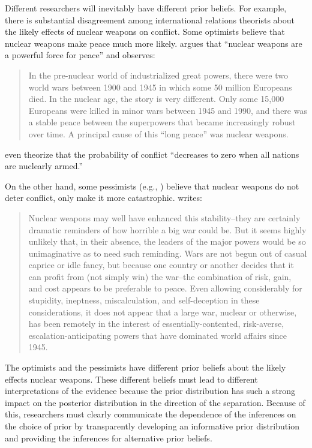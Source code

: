 \documentclass[12pt]{article}
\begin{document}
Different researchers will inevitably have different prior beliefs. 
For example, there is substantial disagreement among international relations theorists about the likely effects of nuclear weapons on conflict. 
Some optimists believe that nuclear weapons make peace much more likely. 
\citet[p. 57]{Mearsheimer1993} argues that ``nuclear weapons are a powerful force for peace'' and observes:
\begin{quote}
In the pre-nuclear world of industrialized great powers, there were two world wars between 1900 and 1945 in which some 50 million Europeans died. In the nuclear age, the story is very different. Only some 15,000 Europeans were killed in minor wars between 1945 and 1990, and there was a stable peace between the superpowers that became increasingly robust over time. A principal cause of this ``long peace'' was nuclear weapons.
\end{quote}
\citet[p. 283]{BDMRiker1982} even theorize that the probability of conflict ``decreases to zero when all nations are nuclearly armed.'' 

On the other hand, some pessimists (e.g., \citealt{Sagan1994}) believe that nuclear weapons do not deter conflict, only make it more catastrophic. 
\citet[pp. 68-69]{Mueller1988} writes: 
\begin{quote}
Nuclear weapons may well have enhanced this stability--they are certainly dramatic reminders of how horrible a big war could be. But it seems highly unlikely that, in their absence, the leaders of the major powers would be so unimaginative as to need such reminding. Wars are not begun out of casual caprice or idle fancy, but because one country or another decides that it can profit from (not simply win) the war--the combination of risk, gain, and cost appears to be preferable to peace. Even allowing considerably for stupidity, ineptness, miscalculation, and self-deception in these considerations, it does not appear that a large war, nuclear or otherwise, has been remotely in the interest of essentially-contented, risk-averse, escalation-anticipating powers that have dominated world affairs since 1945.
\end{quote}

The optimists and the pessimists have different prior beliefs about the likely effects nuclear weapons. 
These different beliefs must lead to different interpretations of the evidence because the prior distribution has such a strong impact on the posterior distribution in the direction of the separation. 
Because of this, researchers must clearly communicate the dependence of the inferences on the choice of prior by transparently developing an informative prior distribution and providing the inferences for alternative prior beliefs.
\end{document}
